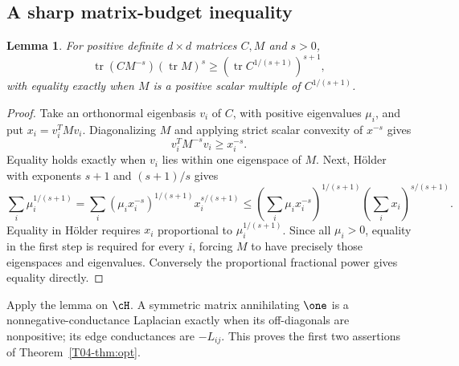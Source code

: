 \documentclass[11pt,a4paper]{article}
\newtheorem{lemma}[theorem]{Lemma}
\theoremstyle{definition}\newtheorem{definition}[theorem]{Definition}
\theoremstyle{remark}\newtheorem{remark}[theorem]{Remark}
\DeclareMathOperator{\tr}{tr}\DeclareMathOperator{\supp}{supp}\DeclareMathOperator{\TV}{TV}
\numberwithin{equation}{section}
\begin{document}
\subsection{A sharp matrix-budget inequality}\label{T04-sec-2}
\begin{lemma}\label{T04-lem:budget}
For positive definite $d\times d$ matrices $C,M$ and $s>0$,
\[
 \tr(CM^{-s})(\tr M)^s\ge(\tr C^{1/(s+1)})^{s+1},
\]
with equality exactly when $M$ is a positive scalar multiple of $C^{1/(s+1)}$.
\end{lemma}
\begin{proof}
Take an orthonormal eigenbasis $v_i$ of $C$, with positive eigenvalues $\mu_i$, and put $x_i=v_i^TMv_i$. Diagonalizing $M$ and applying strict scalar convexity of $x^{-s}$ gives
\[
 v_i^TM^{-s}v_i\ge x_i^{-s}.
\]
Equality holds exactly when $v_i$ lies within one eigenspace of $M$. Next, H\"older with exponents $s+1$ and $(s+1)/s$ gives
\[
 \sum_i\mu_i^{1/(s+1)}
 =\sum_i(\mu_i x_i^{-s})^{1/(s+1)}x_i^{s/(s+1)}
 \le\left(\sum_i\mu_i x_i^{-s}\right)^{1/(s+1)}
       \left(\sum_i x_i\right)^{s/(s+1)}.
\]
Equality in H\"older requires $x_i$ proportional to $\mu_i^{1/(s+1)}$. Since all $\mu_i>0$, equality in the first step is required for every $i$, forcing $M$ to have precisely those eigenspaces and eigenvalues. Conversely the proportional fractional power gives equality directly.
\end{proof}
Apply the lemma on $\cH$. A symmetric matrix annihilating $\one$ is a nonnegative-conductance Laplacian exactly when its off-diagonals are nonpositive; its edge conductances are $-L_{ij}$. This proves the first two assertions of Theorem~\ref{T04-thm:opt}.
\end{document}
